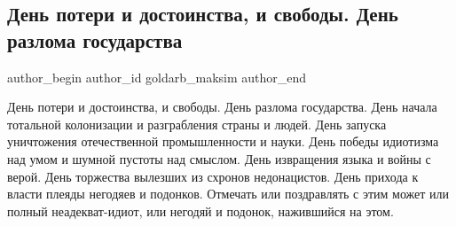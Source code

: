  
 
 
 
 
 
\subsection{День потери и достоинства, и свободы. День разлома государства}
\label{sec:21_11_2021.fb.goldarb_maksim.1.den_razloma_gosudarstva}
 
\ifcmt
 author_begin
   author_id goldarb_maksim
 author_end
\fi

\obeycr
День потери и достоинства, и свободы. 
День разлома государства. 
День начала тотальной колонизации и разграбления страны и людей.
День запуска уничтожения отечественной промышленности и науки. 
День победы идиотизма над умом и шумной пустоты над смыслом. 
День извращения языка и войны с верой. 
День торжества вылезших из схронов недонацистов. 
День прихода к власти плеяды негодяев и подонков. 
Отмечать или поздравлять с этим может или полный неадекват-идиот, или негодяй и подонок, нажившийся на этом.
\restorecr

